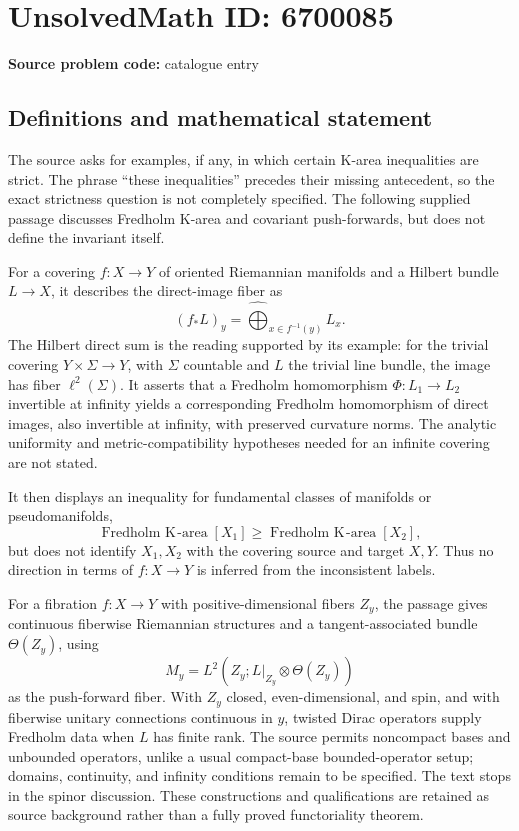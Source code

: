 \documentclass[11pt]{article}
\begin{document}
\section*{UnsolvedMath ID: 6700085}
\textbf{Source problem code:} catalogue entry
\subsection{Definitions and mathematical statement}
The source asks for examples, if any, in which certain K-area inequalities are strict. The phrase ``these inequalities'' precedes their missing antecedent, so the exact strictness question is not completely specified. The following supplied passage discusses Fredholm K-area and covariant push-forwards, but does not define the invariant itself.

For a covering $f:X\to Y$ of oriented Riemannian manifolds and a Hilbert bundle $L\to X$, it describes the direct-image fiber as
\[
(f_*L)_y=\widehat{\bigoplus}_{x\in f^{-1}(y)}L_x.
\]
The Hilbert direct sum is the reading supported by its example: for the trivial covering $Y\times\Sigma\to Y$, with $\Sigma$ countable and $L$ the trivial line bundle, the image has fiber $\ell^2(\Sigma)$. It asserts that a Fredholm homomorphism $\Phi:L_1\to L_2$ invertible at infinity yields a corresponding Fredholm homomorphism of direct images, also invertible at infinity, with preserved curvature norms. The analytic uniformity and metric-compatibility hypotheses needed for an infinite covering are not stated.

It then displays an inequality for fundamental classes of manifolds or pseudomanifolds,
\[
\operatorname{Fredholm\ K\!\text{-}area}[X_1]
\geq\operatorname{Fredholm\ K\!\text{-}area}[X_2],
\]
but does not identify $X_1,X_2$ with the covering source and target $X,Y$. Thus no direction in terms of $f:X\to Y$ is inferred from the inconsistent labels.

For a fibration $f:X\to Y$ with positive-dimensional fibers $Z_y$, the passage gives continuous fiberwise Riemannian structures and a tangent-associated bundle $\Theta(Z_y)$, using
\[
M_y=L^2(Z_y;L|_{Z_y}\otimes\Theta(Z_y))
\]
as the push-forward fiber. With $Z_y$ closed, even-dimensional, and spin, and with fiberwise unitary connections continuous in $y$, twisted Dirac operators supply Fredholm data when $L$ has finite rank. The source permits noncompact bases and unbounded operators, unlike a usual compact-base bounded-operator setup; domains, continuity, and infinity conditions remain to be specified. The text stops in the spinor discussion. These constructions and qualifications are retained as source background rather than a fully proved functoriality theorem.
\end{document}
